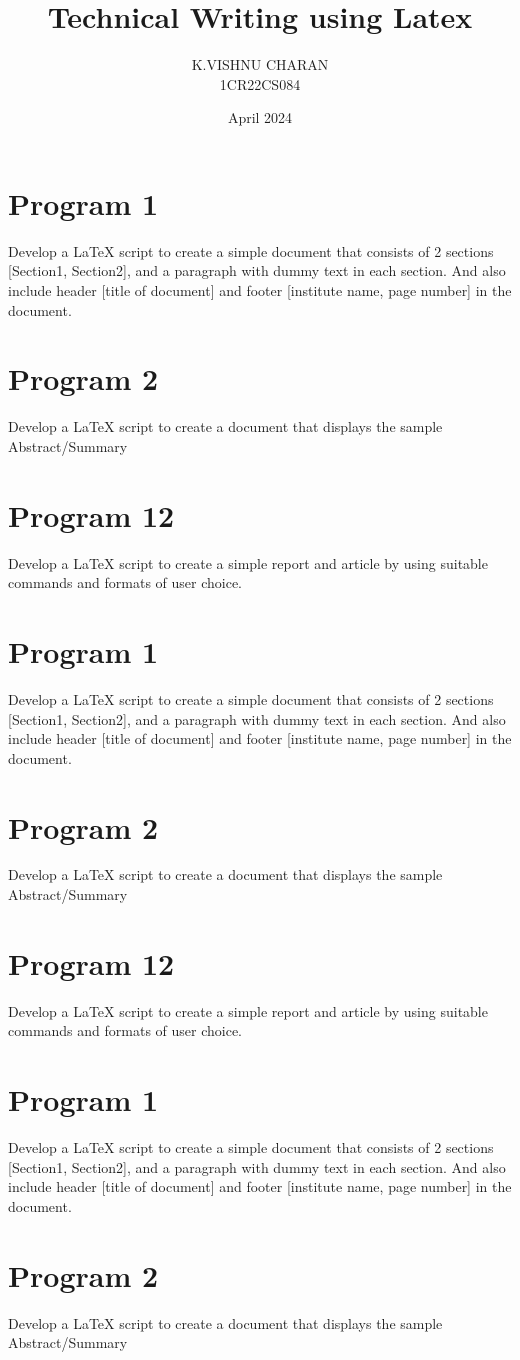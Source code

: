 \documentclass{article}
\title{Technical Writing using Latex}
\author{K.VISHNU CHARAN \\ 1CR22CS084}
\date{April 2024}
\begin{document}
\maketitle
\section{Program 1}
Develop a LaTeX script to create a simple document that consists of 2 sections [Section1, Section2], and a
paragraph with dummy text in each section. And also include header [title of document] and footer
[institute name, page number] in the document. 
\section{Program 2}
Develop a LaTeX script to create a document that displays the sample Abstract/Summary
\section{Program 12}
Develop a LaTeX script to create a simple report and article by using suitable commands and formats of
user choice.
\section{Program 1}
Develop a LaTeX script to create a simple document that consists of 2 sections [Section1, Section2], and a
paragraph with dummy text in each section. And also include header [title of document] and footer
[institute name, page number] in the document. 
\section{Program 2}
Develop a LaTeX script to create a document that displays the sample Abstract/Summary
\section{Program 12}
Develop a LaTeX script to create a simple report and article by using suitable commands and formats of
user choice.
\section{Program 1}
Develop a LaTeX script to create a simple document that consists of 2 sections [Section1, Section2], and a
paragraph with dummy text in each section. And also include header [title of document] and footer
[institute name, page number] in the document. 
\section{Program 2}
Develop a LaTeX script to create a document that displays the sample Abstract/Summary
\end{document}
